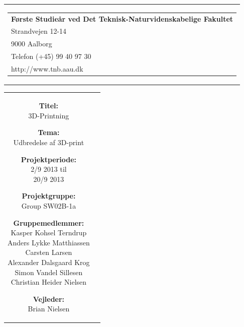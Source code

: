 \thispagestyle{empty}
{\samepage 
\begin{tabular}{r}
	\parbox{\textwidth}{  
	\hfill \parbox{8cm}{\begin{tabular}{l} %
		{\small \textbf{Første Studieår ved Det Teknisk-Naturvidenskabelige Fakultet}}\\
		{\small Strandvejen 12-14} \\
		{\small 9000 Aalborg} \\
		{\small Telefon (+45) 99 40 97 30} \\
		{\small http://www.tnb.aau.dk}
	\end{tabular}}
	}
\end{tabular}

\begin{tabular}{cc}
	\parbox{8cm}{
	\begin{description}
		\item { \textbf{Titel:}}\\ 
			3D-Printning
    		\item { \textbf{Tema:}}\\ 
			Udbredelse af 3D-print
	\end{description}
	
	\parbox{8cm}{
	\begin{description}
		\item { \textbf{Projektperiode:}}\\
			2/9 2013 til\\
			20/9 2013\\
 		\hspace{4cm}
		\item { \textbf{Projektgruppe:}}\\
  			Group SW02B-1a
 		\hspace{4cm}
		\item {\textbf{Gruppemedlemmer:}}\\
			Kasper Kohsel Terndrup\\
			Anders Lykke Matthiassen\\
			Carsten Larsen\\
			Alexander Dalsgaard Krog\\
			Simon Vandel Sillesen\\
			Christian Heider Nielsen\\
		\hspace{2cm}
		\item { \textbf{Vejleder:}}\\
 			Brian Nielsen\\
  	\end{description}
	}

}
\end{tabular}}

